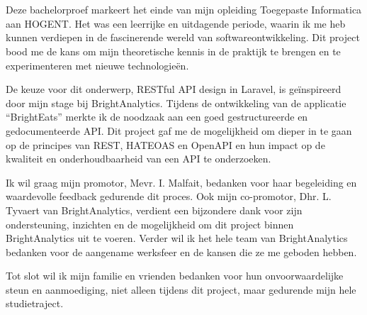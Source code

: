 
\chapter*{}%
\label{ch:voorwoord}

Deze bachelorproef markeert het einde van mijn opleiding Toegepaste Informatica aan HOGENT. Het was een leerrijke en uitdagende periode, waarin ik me heb kunnen verdiepen in de fascinerende wereld van softwareontwikkeling. Dit project bood me de kans om mijn theoretische kennis in de praktijk te brengen en te experimenteren met nieuwe technologieën.

\bigskip

De keuze voor dit onderwerp, RESTful API design in Laravel, is geïnspireerd door mijn stage bij BrightAnalytics. Tijdens de ontwikkeling van de applicatie ``BrightEats'' merkte ik de noodzaak aan een goed gestructureerde en gedocumenteerde API. Dit project gaf me de mogelijkheid om dieper in te gaan op de principes van REST, HATEOAS en OpenAPI en hun impact op de kwaliteit en onderhoudbaarheid van een API te onderzoeken.

\bigskip

Ik wil graag mijn promotor, Mevr. I. Malfait, bedanken voor haar begeleiding en waardevolle feedback gedurende dit proces. Ook mijn co-promotor, Dhr. L. Tyvaert van BrightAnalytics, verdient een bijzondere dank voor zijn ondersteuning, inzichten en de mogelijkheid om dit project binnen BrightAnalytics uit te voeren. Verder wil ik het hele team van BrightAnalytics bedanken voor de aangename werksfeer en de kansen die ze me geboden hebben.

\bigskip

Tot slot wil ik mijn familie en vrienden bedanken voor hun onvoorwaardelijke steun en aanmoediging, niet alleen tijdens dit project, maar gedurende mijn hele studietraject.

